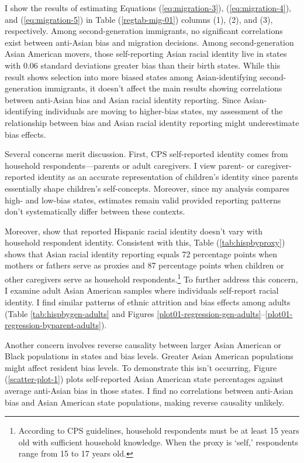 I show the results of estimating Equations (\ref{eq:migration-3}), (\ref{eq:migration-4}), and (\ref{eq:migration-5}) in Table (\ref{regtab-mig-01}) columns (1), (2), and (3), respectively. Among second-generation immigrants, no significant correlations exist between anti-Asian bias and migration decisions. Among second-generation Asian American movers, those self-reporting Asian racial identity live in states with 0.06 standard deviations greater bias than their birth states. While this result shows selection into more biased states among Asian-identifying second-generation immigrants, it doesn't affect the main results showing correlations between anti-Asian bias and Asian racial identity reporting. Since Asian-identifying individuals are moving to higher-bias states, my assessment of the relationship between bias and Asian racial identity reporting might underestimate bias effects.

Several concerns merit discussion. First, CPS self-reported identity comes from household respondents---parents or adult caregivers. I view parent- or caregiver-reported identity as an accurate representation of children's identity since parents essentially shape children's self-concepts. Moreover, since my analysis compares high- and low-bias states, estimates remain valid provided reporting patterns don't systematically differ between these contexts.

Moreover, \textcite{duncanIntermarriageIntergenerationalTransmission2011} show that reported Hispanic racial identity doesn't vary with household respondent identity. Consistent with this, Table (\ref{tab:hispbyproxy}) shows that Asian racial identity reporting equals 72 percentage points when mothers or fathers serve as proxies and 87 percentage points when children or other caregivers serve as household respondents.\footnote{According to CPS guidelines, household respondents must be at least 15 years old with sufficient household knowledge. When the proxy is `self,' respondents range from 15 to 17 years old.} To further address this concern, I examine adult Asian American samples where individuals self-report racial identity. I find similar patterns of ethnic attrition and bias effects among adults (Table \ref{tab:hispbygen-adults} and Figures \ref{plot01-regression-gen-adults}--\ref{plot01-regression-byparent-adults}).

Another concern involves reverse causality between larger Asian American or Black populations in states and bias levels. Greater Asian American populations might affect resident bias levels. To demonstrate this isn't occurring, Figure (\ref{scatter-plot-1}) plots self-reported Asian American state percentages against average anti-Asian bias in those states. I find no correlations between anti-Asian bias and Asian American state populations, making reverse causality unlikely.

